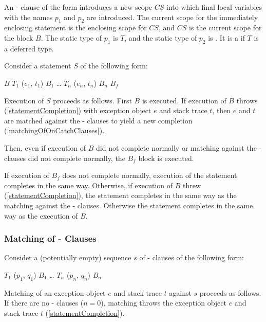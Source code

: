 \documentclass[makeidx]{article}
\begin{document}
{\LMHash{}%
An \ON-\CATCH{} clause of the form
introduces a new scope $CS$ into which final local variables
with the names $p_1$ and $p_2$ are introduced.
The current scope for the immediately enclosing \TRY{} statement
is the enclosing scope for $CS$,
and $CS$ is the current scope for the block $B$.
The static type of $p_1$ is $T$,
and the static type of $p_2$ is .
It is a  if $T$ is a deferred type.

\LMHash{}%
Consider a \TRY{} statement $S$ of the following form:

\begin{normativeDartCode}
\TRY{} $B$
\ON{} $T_1$ \CATCH{} ($e_1$, $t_1$) $B_1$
\ldots{}
\ON{} $T_n$ \CATCH{} ($e_n$, $t_n$) $B_n$
\FINALLY{} $B_f$
\end{normativeDartCode}

\LMHash{}%
Execution of $S$ proceeds as follows.
First $B$ is executed.
If execution of $B$ throws (\ref{statementCompletion})
with exception object $e$ and stack trace $t$,
then $e$ and $t$ are matched against the \ON-\CATCH{} clauses
to yield a new completion
(\ref{matchingOfOnCatchClauses}).

\LMHash{}%
Then, even if execution of $B$ did not complete normally
or matching against the \ON-\CATCH{} clauses did not complete normally,
the $B_f$ block is executed.

\LMHash{}%
If execution of $B_f$ does not complete normally,
execution of the \TRY{} statement completes in the same way.
Otherwise, if execution of $B$ threw (\ref{statementCompletion}),
the \TRY{} statement completes in the same way as
the matching against the \ON-\CATCH{} clauses.
Otherwise the \TRY{} statement completes in the same way as
the execution of $B$.


\subsubsection{Matching of \ON-\CATCH{} Clauses}

\LMHash{}%
Consider a (potentially empty) sequence $s$ of
\ON-\CATCH{} clauses of the following form:

\begin{normativeDartCode}
\ON{} $T_1$ \CATCH{} ($p_1$, $q_1$) $B_1$
\ldots
\ON{} $T_n$ \CATCH{} ($p_n$, $q_n$) $B_n$
\end{normativeDartCode}

\LMHash{}%
Matching of an exception object $e$ and stack trace $t$ against $s$
proceeds as follows.
If there are no \ON-\CATCH{} clauses ($n = 0$),
matching throws the exception object $e$ and stack trace $t$
(\ref{statementCompletion}).

}
\end{document}
